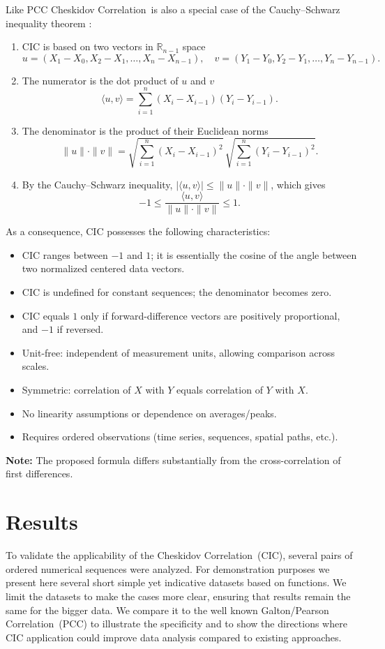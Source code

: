 \documentclass[qe,nameyear,draft]{econsocart}
\newcommand{\cic}{\text{CIC}}
\newcommand{\cicFull}{\textnormal{Cheskidov Correlation}}
\newcommand{\pcc}{\text{PCC}}
\newcommand{\pccFull}{\textnormal{Galton/Pearson Correlation}}
\begin{document}
Like $\pcc$ \cicFull\ is also a special case of the Cauchy\allowbreak--\allowbreak Schwarz inequality theorem \cite{r3}:
\begin{enumerate}
\item $\cic$ is based on two vectors in $\mathbb{R}_{n-1}$ space
\[
u = (X_1-X_0, X_2-X_1, \dots, X_n-X_{n-1}), \quad
v = (Y_1-Y_0, Y_2-Y_1, \dots, Y_n-Y_{n-1}).
\]
\item The numerator is the dot product of $u$ and $v$
\[
\langle u,v \rangle = \sum_{i=1}^n (X_i - X_{i-1})(Y_i - Y_{i-1}).
\]
\item The denominator is the product of their Euclidean norms
\[
\|u\| \cdot \|v\| = \sqrt{\sum_{i=1}^n (X_i - X_{i-1})^2} \, \sqrt{\sum_{i=1}^n (Y_i - Y_{i-1})^2}.
\]
\item By the Cauchy–Schwarz inequality, $|\langle u,v \rangle| \le \|u\|\cdot \|v\|$, which gives
\[
-1 \le \frac{\langle u,v \rangle}{\|u\|\cdot \|v\|} \le 1.
\]
\end{enumerate}

As a consequence, $\cic$ possesses the following characteristics:
\begin{itemize}
\item $\cic$ ranges between $-1$ and $1$; it is essentially the cosine of the angle between two normalized centered data vectors.
\item $\cic$ is undefined for constant sequences; the denominator becomes zero.
\item $\cic$ equals $1$ only if forward-difference vectors are positively proportional, and $-1$ if reversed.
\item Unit-free: independent of measurement units, allowing comparison across scales.
\item Symmetric: correlation of $X$ with $Y$ equals correlation of $Y$ with $X$.
\item No linearity assumptions or dependence on averages/peaks.
\item Requires ordered observations (time series, sequences, spatial paths, etc.).
\end{itemize}


\textbf{Note:} The proposed formula differs substantially from the cross-correlation of first differences.


\section{Results}

To validate the applicability of the \cicFull\ ($\cic$), several pairs of ordered numerical sequences were analyzed. For demonstration purposes we present here several short simple yet indicative datasets based on functions. We limit the datasets to make the cases more clear, ensuring that results remain the same for the bigger data. We compare it to the well known \pccFull\ ($\pcc$) to illustrate the specificity and to show the directions where $\cic$ application could improve data analysis compared to existing approaches.
\end{document}
